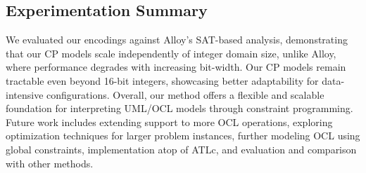 \subsection*{Experimentation Summary}
We evaluated our encodings against Alloy’s SAT-based analysis, demonstrating that our CP models scale independently of integer domain size, unlike Alloy, where performance degrades with increasing bit-width. Our CP models remain tractable even beyond 16-bit integers, showcasing better adaptability for data-intensive configurations.
Overall, our method offers a flexible and scalable foundation for interpreting UML/OCL models through constraint programming. Future work includes extending support to more OCL operations, exploring optimization techniques for larger problem instances, further modeling OCL using global constraints, implementation atop of ATLc, and evaluation and comparison with other methods.




